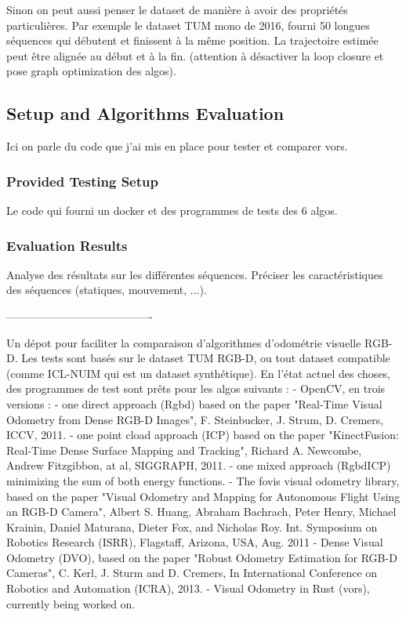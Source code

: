 Sinon on peut aussi penser le dataset de manière à avoir des propriétés particulières.
Par exemple le dataset TUM mono de 2016, fourni 50 longues séquences qui débutent
et finissent à la même position.
La trajectoire estimée peut être alignée au début et à la fin.
(attention à désactiver la loop closure et pose graph optimization des algos).

\subsection{Setup and Algorithms Evaluation}%
\label{sub:algorithms_eval}

Ici on parle du code que j'ai mis en place pour tester et comparer vors.

\subsubsection{Provided Testing Setup}%
\label{ssub:setup}

Le code qui fourni un docker et des programmes de tests des 6 algos.

\subsubsection{Evaluation Results}%
\label{ssub:eval_results}

Analyse des résultats sur les différentes séquences.
Préciser les caractéristiques des séquences (statiques, mouvement, ...).


----------------------------------------

Un dépot pour faciliter la comparaison d’algorithmes d’odométrie visuelle RGB-D. Les tests sont basés sur le dataset TUM RGB-D, ou tout dataset compatible (comme ICL-NUIM qui est un dataset synthétique). En l’état actuel des choses, des programmes de test sont prêts pour les algos suivants :
- OpenCV, en trois versions :
  - one direct approach (Rgbd) based on the paper "Real-Time Visual Odometry from Dense RGB-D Images", F. Steinbucker, J. Strum, D. Cremers, ICCV, 2011.
  - one point cload approach (ICP) based on the paper "KinectFusion: Real-Time Dense Surface Mapping and Tracking", Richard A. Newcombe, Andrew Fitzgibbon, at al, SIGGRAPH, 2011.
  - one mixed approach (RgbdICP) minimizing the sum of both energy functions.
- The fovis visual odometry library, based on the paper "Visual Odometry and Mapping for Autonomous Flight Using an RGB-D Camera", Albert S. Huang, Abraham Bachrach, Peter Henry, Michael Krainin, Daniel Maturana, Dieter Fox, and Nicholas Roy. Int. Symposium on Robotics Research (ISRR), Flagstaff, Arizona, USA, Aug. 2011
- Dense Visual Odometry (DVO), based on the paper "Robust Odometry Estimation for RGB-D Cameras", C. Kerl, J. Sturm and D. Cremers, In International Conference on Robotics and Automation (ICRA), 2013.
- Visual Odometry in Rust (vors), currently being worked on.

